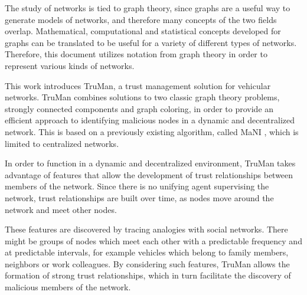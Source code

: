 %

The study of networks is tied to graph theory, since graphs are a useful way to generate models of networks, and therefore many concepts of the two fields overlap.
Mathematical, computational and statistical concepts developed for graphs can be translated to be useful for a variety of different types of networks.
Therefore, this document utilizes notation from graph theory in order to represent various kinds of networks.

This work introduces TruMan, a trust management solution for vehicular networks. 
TruMan combines solutions to two classic graph theory problems, strongly connected components and graph coloring, in order to provide an efficient approach to identifying malicious nodes in a dynamic and decentralized network.
This is based on a previously existing algorithm, called MaNI \citep{vernize2015malicious}, which is limited to centralized networks.

In order to function in a dynamic and decentralized environment, TruMan takes advantage of features that allow the development of trust relationships between members of the network.
Since there is no unifying agent supervising the network, trust relationships are built over time, as nodes move around the network and meet other nodes.

These features are discovered by tracing analogies with social networks.
There might be groups of nodes which meet each other with a predictable frequency and at predictable intervals, for example vehicles which belong to family members, neighbors or work colleagues.
By considering such features, TruMan allows the formation of strong trust relationships,  which in turn facilitate the discovery of malicious members of the network.

